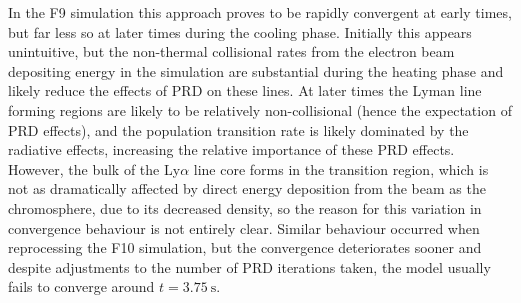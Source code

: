 In the F9 simulation this approach proves to be rapidly convergent at early times, but far less so at later times during the cooling phase.
Initially this appears unintuitive, but the non-thermal collisional rates from the electron beam depositing energy in the simulation are substantial during the heating phase and likely reduce the effects of PRD on these lines.
At later times the Lyman line forming regions are likely to be relatively non-collisional (hence the expectation of PRD effects), and the population transition rate is likely dominated by the radiative effects, increasing the relative importance of these PRD effects.
However, the bulk of the Ly$\alpha$ line core forms in the transition region, which is not as dramatically affected by direct energy deposition from the beam as the chromosphere, due to its decreased density, so the reason for this variation in convergence behaviour is not entirely clear.
Similar behaviour occurred when reprocessing the F10 simulation, but the convergence deteriorates sooner and despite adjustments to the number of PRD iterations taken, the model usually fails to converge around $t=\SI{3.75}{\second}$.

